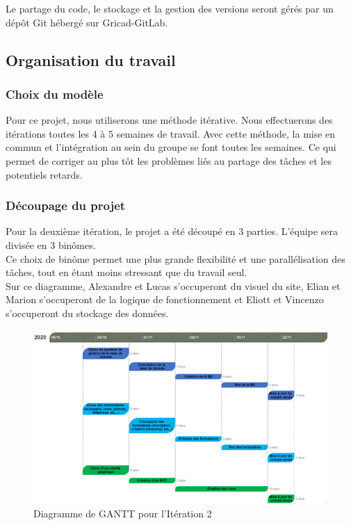 \documentclass[a4paper,11pt]{article}
\begin{document}
Le partage du code, le stockage et la gestion des versions seront gérés par un dépôt Git hébergé sur
Gricad-GitLab.\\

\subsection{Organisation du travail}

\subsubsection{Choix du modèle}

Pour ce projet, nous utiliserons une méthode itérative. Nous effectuerons des itérations toutes les 4
à 5 semaines de travail. Avec cette méthode, la mise en commun et l'intégration au sein du groupe se font toutes les semaines.
Ce qui permet de corriger au plus tôt les problèmes liés au partage des tâches et les potentiels retards.\\

\subsubsection{Découpage du projet}

Pour la deuxième itération, le projet a été découpé en 3 parties. L’équipe sera divisée en 3 binômes.\\

Ce choix de binôme permet une plus grande flexibilité et une parallélisation des tâches, tout en étant
moins stressant que du travail seul.\\

Sur ce diagramme, Alexandre et Lucas s'occuperont du visuel du site,
Elian et Marion s'occuperont de la logique de fonctionnement et
Eliott et Vincenzo s'occuperont du stockage des données.\\

\begin{figure}[H]
  \includegraphics[width=\linewidth]{images/gantt-iteration2.png}
  \caption{Diagramme de GANTT pour l'Itération 2}
  \label{fig:gantt-iteration2}
\end{figure}
\end{document}
